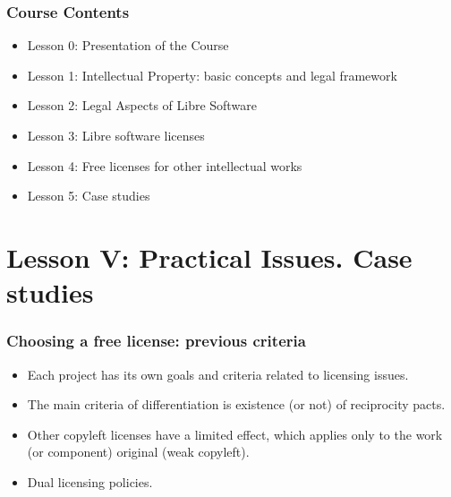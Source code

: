 


\begin{frame}
  \frametitle{Course Contents}

  \begin{itemize}
    \item Lesson 0: Presentation of the Course
    \item Lesson 1: Intellectual Property: basic concepts and legal framework
    \item Lesson 2: Legal Aspects of Libre Software
    \item Lesson 3: Libre software licenses
    \item Lesson 4: Free licenses for other intellectual works
    \item \alert{Lesson 5: Case studies}
  \end{itemize}

\end{frame}

\section{Lesson V: Practical Issues. Case studies}


\begin{frame}
\frametitle{Choosing a free license: previous criteria}

\begin{itemize}
\item Each project has its own goals and criteria related to licensing issues.
\item The main criteria of differentiation is existence (or not) of \alert{reciprocity pacts}.
\item Other copyleft licenses have a limited effect, which applies only to the work (or component) original (weak copyleft). 
\item Dual licensing policies.

\end{itemize}

\end{frame}

